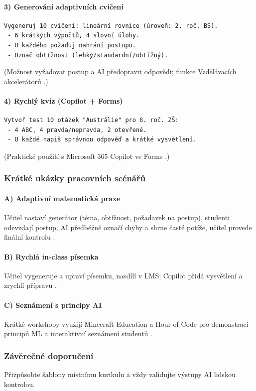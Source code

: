 \paragraph{3) Generování adaptivních cvičení}
\begin{verbatim}
Vygeneruj 10 cvičení: lineární rovnice (úroveň: 2. roč. BS).
 - 6 krátkých výpočtů, 4 slovní úlohy.
 - U každého požaduj nahrání postupu.
 - Označ obtížnost (lehký/standardní/obtížný).
\end{verbatim}
(Možnost vyžadovat postup a AI předopravit odpovědi; funkce Vzdělávacích akcelerátorů \cite{kb_ai_101_tipu_pdf_04e4a115_page_8_1}.)

\paragraph{4) Rychlý kvíz (Copilot + Forms)}
\begin{verbatim}
Vytvoř test 10 otázek "Austrálie" pro 8. roč. ZŠ:
 - 4 ABC, 4 pravda/nepravda, 2 otevřené.
 - U každé napiš správnou odpověď a krátké vysvětlení.
\end{verbatim}
(Praktické použití s Microsoft 365 Copilot ve Forms \cite{kb_ai_101_tipu_pdf_04e4a115_page_36_1}.)

\subsubsection*{Krátké ukázky pracovních scénářů}
\paragraph{A) Adaptivní matematická praxe}
Učitel nastaví generátor (téma, obtížnost, požadavek na postup), studenti odevzdají postup; AI předběžně označí chyby a shrne časté potíže, učitel provede finální kontrolu \cite{kb_ai_101_tipu_pdf_04e4a115_page_8_1}.

\paragraph{B) Rychlá in‑class písemka}
Učitel vygeneruje a upraví písemku, nasdílí v LMS; Copilot přidá vysvětlení a zrychlí přípravu \cite{kb_ai_101_tipu_pdf_04e4a115_page_36_1}.

\paragraph{C) Seznámení s principy AI}
Krátké workshopy využijí Minecraft Education a Hour of Code pro demonstraci principů ML a interaktivní seznámení studentů \cite{kb_ai_101_tipu_pdf_04e4a115_page_15_2}.

\subsubsection*{Závěrečné doporučení}
Přizpůsobte šablony místnímu kurikulu a vždy validujte výstupy AI lidskou kontrolou.